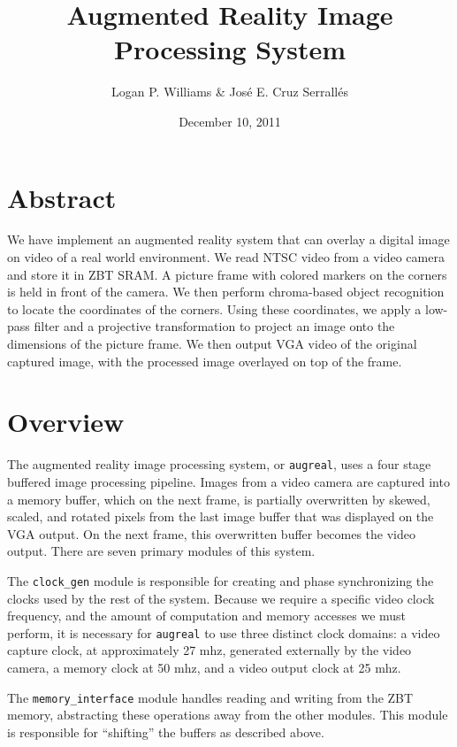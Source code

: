 \documentclass[10pt]{article}
\begin{document}
\title{Augmented Reality Image Processing System}
\author{Logan P. Williams \& Jos\'{e} E. Cruz Serrall\'{e}s}
\date{December 10, 2011}
\maketitle

\section*{Abstract}
We have implement an augmented reality system that can overlay a digital image on video of a real world environment. We read NTSC video from a video camera and store it in ZBT SRAM. A picture frame with colored markers on the corners is held in front of the camera. We then perform chroma-based object recognition to locate the coordinates of the corners. Using these coordinates, we apply a low-pass filter and a projective transformation to project an image onto the dimensions of the picture frame. We then output VGA video of the original captured image, with the processed image overlayed on top of the frame.

\newpage

\tableofcontents
\listoffigures

\newpage

\section{Overview}
The augmented reality image processing system, or {\tt augreal}, uses a four stage buffered image processing pipeline. Images from a video camera are captured into a memory buffer, which on the next frame, is partially overwritten by skewed, scaled, and rotated pixels from the last image buffer that was displayed on the VGA output. On the next frame, this overwritten buffer becomes the video output. There are seven primary modules of this system.

The {\tt clock\_gen} module is responsible for creating and phase synchronizing the clocks used by the rest of the system. Because we require a specific video clock frequency, and the amount of computation and memory accesses we must perform, it is necessary for {\tt augreal} to use three distinct clock domains: a video capture clock, at approximately 27 mhz, generated externally by the video camera, a memory clock at 50 mhz, and a video output clock at 25 mhz.

The {\tt memory\_interface} module handles reading and writing from the ZBT memory, abstracting these operations away from the other modules. This module is responsible for ``shifting'' the buffers as described above.
\end{document}
